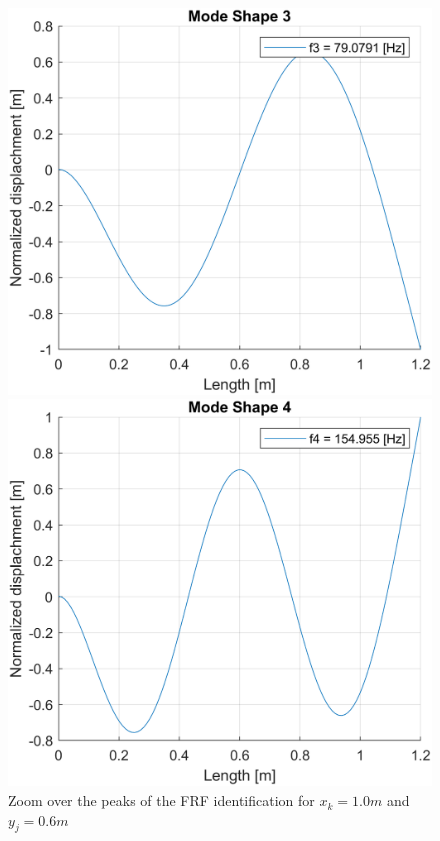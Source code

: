 \begin{figure}[H]
\begin{minipage}[b]{0.45\textwidth}
    \end{minipage}
    \begin{minipage}[b]{0.45\textwidth}
        \centering
        \includegraphics[width=\textwidth]{img/MATLAB/Part_A/Mode_shapes/mode_shape_03.png}
    \end{minipage}
    \hfill
    \begin{minipage}[b]{0.45\textwidth}
        \centering
        \includegraphics[width=\textwidth]{img/MATLAB/Part_A/Mode_shapes/mode_shape_04.png}
    \end{minipage}
    \caption{Zoom over the peaks of the FRF identification for $x_k = 1.0m$ and $y_j = 0.6m$}
    \label{fig:FRF_identification_zoom}
\end{figure}
